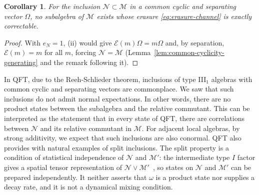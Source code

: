 \documentclass[a4paper,11pt]{article}
\newtheorem{corollary}[theorem]{Corollary}
\theoremstyle{definition}
\newcommand{\mN}{\mathcal{N}}
\newcommand{\mM}{\mathcal{M}}
\newcommand{\mE}{\mathcal{E}}
\begin{document}
\begin{corollary}\label{cor:common-cyclic-noncorrectable}
For the inclusion $\mN\subset \mM$ in a common cyclic and separating vector $\Omega$, no subalgebra of $\mM$ exists whose erasure \eqref{eq:erasure-channel} is exactly correctable.    
\end{corollary}

\begin{proof}
With $e_N=1$, (ii) would give $\mE(m)\Omega=m\Omega$ and, by separation, $\mE(m)=m$ for all $m$, forcing $\mathcal N=\mathcal M$ (Lemma~\ref{lem:common-cyclicity-generating} and the remark following it).
\end{proof}


In QFT, due to the Reeh-Schlieder theorem, inclusions of type III$_1$ algebras with common cyclic and separating vectors are commonplace. We saw that such inclusions do not admit normal expectations. In other words, there are no product states between the subalgebra and the relative commutant. This can be interpreted as the statement that in every state of QFT, there are correlations between $\mN$ and its relative commutant in $\mM$. For adjacent local algebras, by strong additivity, we expect that such inclusions are also conormal. QFT also provides with natural examples of split inclusions. The split property is a condition of statistical independence of $\mathcal N$ and $\mathcal M'$: the intermediate type $I$ factor gives a spatial tensor representation of $\mathcal N\vee\mathcal M'$~\cite{standardinclusion}, so states on $\mathcal N$ and $\mathcal M'$ can be prepared independently. It neither asserts that $\omega$ is a product state nor supplies a decay rate, and it is not a dynamical mixing condition.
\end{document}
